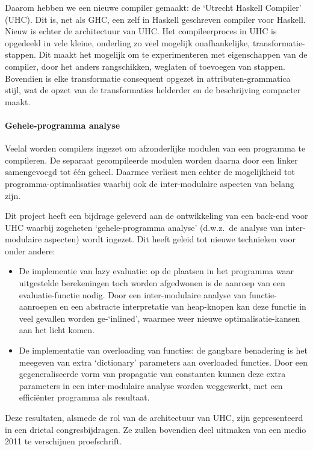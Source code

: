 \documentclass{article}
\begin{document}
Daarom hebben we een nieuwe compiler gemaakt: de `Utrecht Haskell Compiler' (UHC).
Dit is, net als GHC, een zelf in Haskell geschreven compiler voor Haskell.
Nieuw is echter de architectuur van UHC. 
Het compileerproces in UHC is opgedeeld in vele kleine, onderling zo veel mogelijk onafhankelijke,
transformatie-stappen.
Dit maakt het mogelijk om te experimenteren met eigenschappen van de compiler,
door het anders rangschikken, weglaten of toevoegen van stappen.
Bovendien is elke transformatie consequent opgezet in attributen-grammatica stijl,
wat de opzet van de transformaties helderder en de beschrijving compacter maakt.

\paragraph{Gehele-programma analyse}

Veelal worden compilers ingezet om afzonderlijke modulen van een programma te compileren.
De separaat gecompileerde modulen worden daarna door een linker samengevoegd tot \'e\'en geheel.
Daarmee verliest men echter de mogelijkheid tot programma-optimalisaties waarbij
ook de inter-modulaire aspecten van belang zijn.

Dit project heeft een bijdrage geleverd aan de ontwikkeling van een back-end voor UHC
waarbij zogeheten `gehele-programma analyse' (d.w.z.\ de analyse van inter-modulaire aspecten)
wordt ingezet.
Dit heeft geleid tot nieuwe technieken voor onder andere:
\begin{itemize}
\item De implementie van lazy evaluatie:
   op de plaatsen in het programma waar uitgestelde berekeningen toch
   worden afgedwonen is de aanroep van een evaluatie-functie nodig.
   Door een inter-modulaire analyse van functie-aanroepen
   en een abstracte interpretatie van heap-knopen kan deze functie
   in veel gevallen worden ge-`inlined', waarmee weer nieuwe 
   optimalisatie-kansen aan het licht komen.
\item De implementatie van overloading van functies:
   de gangbare benadering is het meegeven van extra `dictionary' parameters
   aan overloaded functies. 
   Door een gegeneraliseerde vorm van propagatie van constanten kunnen
   deze extra parameters in een inter-modulaire analyse worden weggewerkt,
   met een effici\"enter programma als resultaat.
\end{itemize}
Deze resultaten, alsmede de rol van de architectuur van UHC, zijn gepresenteerd
in een drietal congresbijdragen. Ze zullen bovendien deel uitmaken van een
medio 2011 te verschijnen proefschrift.
\end{document}
